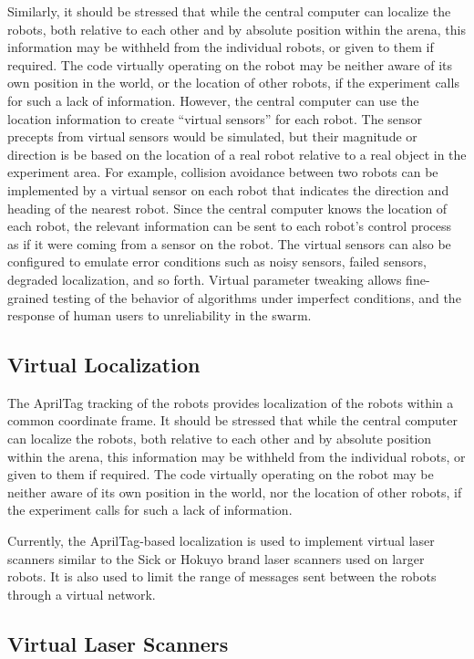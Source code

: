 \documentclass[]{article}
\begin{document}
Similarly, it should be stressed that while the central computer can localize the robots, both relative to each other and by absolute position within the arena, this information may be withheld from the individual robots, or given to them if required. 
The code virtually operating on the robot may be neither aware of its own position in the world, or the location of other robots, if the experiment calls for such a lack of information. 
However, the central computer can use the location information to create ``virtual sensors'' for each robot. 
The sensor precepts from virtual sensors would be simulated, but their magnitude or direction is be based on the location of a real robot relative to a real object in the experiment area. 
For example, collision avoidance between two robots can be implemented by a virtual sensor on each robot that indicates the direction and heading of the nearest robot. 
Since the central computer knows the location of each robot, the relevant information can be sent to each robot's control process as if it were coming from a sensor on the robot. 
The virtual sensors can also be configured to emulate error conditions such as noisy sensors, failed sensors, degraded localization, and so forth.
Virtual parameter tweaking allows fine-grained testing of the behavior of algorithms under imperfect conditions, and the response of human users to unreliability in the swarm. 

\subsection{Virtual Localization}

The AprilTag tracking of the robots provides localization of the robots within a common coordinate frame. 
It should be stressed that while the central computer can localize the robots, both relative to each other and by absolute position within the arena, this information may be withheld from the individual robots, or given to them if required. 
The code virtually operating on the robot may be neither aware of its own position in the world, nor the location of other robots, if the experiment calls for such a lack of information. 

Currently, the AprilTag-based localization is used to implement virtual laser scanners similar to the Sick or Hokuyo brand laser scanners used on larger robots. 
It is also used to limit the range of messages sent between the robots through a virtual network. 

\subsection{Virtual Laser Scanners}
\end{document}
